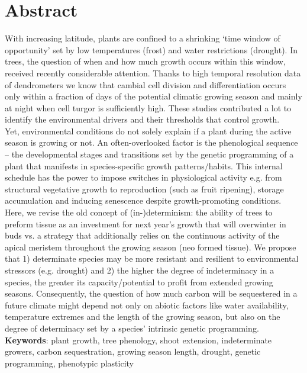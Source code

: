 \documentclass{article}
\begin{document}
	
\section*{Abstract} %
		With increasing latitude, plants are confined to a shrinking ‘time window of opportunity’ set by low temperatures (frost) and water restrictions (drought). In trees, the question of when and how much growth occurs within this window, received recently considerable attention. Thanks to high temporal resolution data of dendrometers we know that cambial cell division and differentiation occurs only within a fraction of days of the potential climatic growing season and mainly at night when cell turgor is sufficiently high. These studies contributed a lot to identify the environmental drivers and their thresholds that control growth. \\
		Yet, environmental conditions do not solely explain if a plant during the active season is growing or not. An often-overlooked factor is the phenological sequence – the developmental stages and transitions set by the genetic programming of a plant that manifests in species-specific growth patterns/habits. This internal schedule has the power to impose switches in physiological activity e.g. from structural vegetative growth to reproduction (such as fruit ripening), storage accumulation and inducing senescence despite growth-promoting conditions.\\
		Here, we revise the old concept of (in-)determinism: the ability of trees to preform tissue as an investment for next year’s growth that will overwinter in buds vs. a strategy that additionally relies on the continuous activity of the apical meristem throughout the growing season (neo formed tissue). We propose that 1) determinate species may be more resistant and resilient to environmental stressors (e.g. drought) and 2) the higher the degree of indeterminacy in a species, the greater its capacity/potential to profit from extended growing seasons. Consequently, the question of how much carbon will be sequestered in a future climate might depend not only on abiotic factors like water availability, temperature extremes and the length of the growing season, but also on the degree of determinacy set by a species' intrinsic genetic programming.\\
		
			\textbf{Keywords}: plant growth, tree phenology, shoot extension, indeterminate growers, carbon sequestration, growing season length, drought, genetic programming, phenotypic plasticity
			\newpage
	
\end{document}
